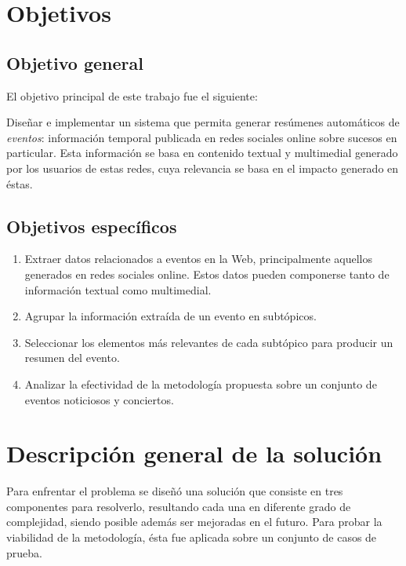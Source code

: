 \documentclass[upright, contnum]{umemoria}
\begin{document}
\section{Objetivos}
\label{sec-1.2}

\subsection{Objetivo general}
\label{sec-1.2.1}


    El objetivo principal de este trabajo fue el siguiente:

    Diseñar e implementar un sistema que permita generar resúmenes
    automáticos de \emph{eventos}: información temporal publicada en redes
    sociales online sobre sucesos en particular. Esta información se
    basa en contenido textual y multimedial generado por los usuarios
    de estas redes, cuya relevancia se basa en el impacto generado en
    éstas.


\subsection{Objetivos específicos}
\label{sec-1.2.2}


\begin{enumerate}
\item Extraer datos relacionados a eventos en la Web, principalmente
       aquellos generados en redes sociales online. Estos datos pueden
       componerse tanto de información textual como multimedial.
\item Agrupar la información extraída de un evento en subtópicos.
\item Seleccionar los elementos más relevantes de cada subtópico para
       producir un resumen del evento.
\item Analizar la efectividad de la metodología propuesta sobre un
       conjunto de eventos noticiosos y conciertos.
\end{enumerate}
\section{Descripción general de la solución}
\label{sec-1.3}

   
   Para enfrentar el problema se diseñó una solución que consiste en
   tres componentes para resolverlo, resultando cada una en diferente
   grado de complejidad, siendo posible además ser mejoradas en el
   futuro. Para probar la viabilidad de la metodología, ésta fue
   aplicada sobre un conjunto de casos de prueba.
\end{document}
